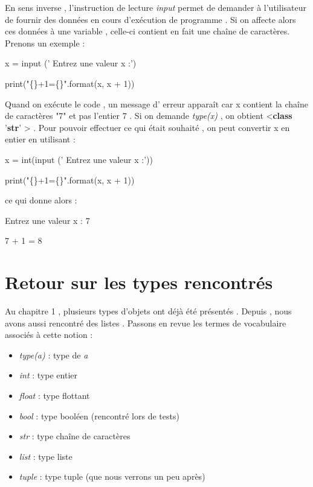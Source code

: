En sens inverse , l'instruction de lecture \textit{input} permet de demander à l'utilisateur de fournir des données en cours d'exécution de programme . Si on affecte alors ces données à une variable , celle-ci contient en fait une chaîne de caractères. 
Prenons un exemple :\par
\par
x = input (' Entrez une valeur x :')\par
print("\{\}+1=\{\}".format(x, x + 1))\par
\par
Quand on exécute le code , un message d' erreur apparaît car x contient la chaîne de caractères "7" et pas l'entier 7 . Si on demande \textit{type(x)} , on obtient <\textbf{class} '\textbf{str}' > . Pour pouvoir effectuer ce qui était souhaité , on peut convertir x en entier en utilisant :\par
\par
x = int(input (' Entrez une valeur x :'))\par
print("\{\}+1=\{\}".format(x, x + 1))\par
\par
ce qui donne alors :\par
\par
Entrez une valeur x : 7 \par
7 + 1 = 8


\section{Retour sur les types rencontrés}

Au chapitre 1 , plusieurs types d'objets ont déjà été présentés . Depuis , nous avons aussi rencontré des listes . Passons en revue les termes de vocabulaire associés à cette notion :

\begin{itemize}
\item \textit{type(a)} : type de \textit{a}
\item \textit{int} : type entier
\item \textit{float} : type flottant
\item \textit{bool} : type booléen  (rencontré lors de tests)
\item \textit{str} : type chaîne de caractères
\item \textit{list} : type liste
\item \textit{tuple} : type tuple (que nous verrons un peu après)
\end{itemize} 

